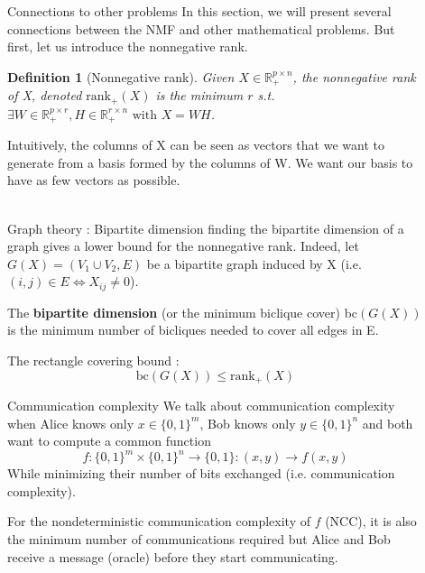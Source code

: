 \documentclass[final]{beamer}
\newlength{\sepwid}
\newlength{\onecolwid}
\newlength{\threecolwid}
\newtheorem{defn}[thm]{Definition}
\begin{document}
\begin{frame}
\begin{columns}[t]
\begin{column}{\threecolwid}
\end{column}
\begin{column}{\sepwid}
\end{column} %
\begin{column}{\onecolwid} %



\begin{exampleblock}{Connections to other problems}
\footnotesize
In this section, we will present several connections between the NMF and other mathematical problems. But first, let us introduce the nonnegative rank.
\begin{defn}[Nonnegative rank]
Given $X \in \mathbb{R}_+^{p\times n}$, the nonnegative rank of X, denoted $\text{rank}_+(X)$ is the minimum $r$ s.t. $\exists W \in \mathbb{R}_+^{p\times r}, H \in \mathbb{R}_+^{r\times n} \text{ with } X = WH$.
\end{defn}

Intuitively, the columns of X can be seen as vectors that we want to generate from a basis formed by the columns of W. We want our basis to have as few vectors as possible.
~\\
~\\
\begin{block}{Graph theory : Bipartite dimension}
finding the bipartite dimension of a graph gives a lower bound for the nonnegative rank. Indeed, let $G(X) = (V_1 \cup V_2, E)$ be a bipartite graph induced by X (i.e. $(i,j)\in E \Leftrightarrow X_{ij}\neq 0$). 
    
    The \textbf{bipartite dimension} (or the minimum biclique cover) bc$(G(X))$ is the minimum number of bicliques needed to cover all edges in E.
    
    The rectangle covering bound : 
    \[\text{bc}(G(X))\leq \text{rank}_+(X)
\]
\end{block}
\begin{block}{Communication complexity}
We talk about communication complexity when Alice knows only $x \in \{0,1\}^m$, Bob knows only $y \in \{0,1\}^n$ and both want to compute a common function
    \[f:\{0,1\}^m \times \{0,1\}^n \rightarrow \{0,1\} : (x,y) \rightarrow f(x,y)
    \]
    While minimizing their number of bits exchanged (i.e. communication complexity).

    For the nondeterministic communication complexity of $f$ (NCC), it is also the minimum number of communications required but Alice and Bob receive a message (oracle) before they start communicating.


\end{block}
\end{exampleblock}
\end{column}
\end{columns}
\end{frame}
\end{document}
